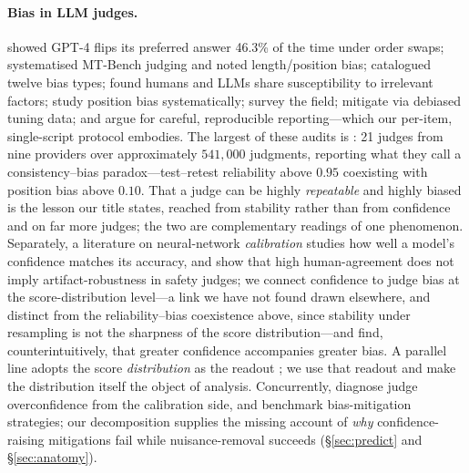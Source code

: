 \documentclass[11pt]{article}
\begin{document}
\paragraph{Bias in LLM judges.} \citet{wang2023large} showed GPT-4 flips its
preferred answer 46.3\% of the time under order swaps; \citet{zheng2023judging}
systematised MT-Bench judging and noted length/position bias; \citet{ye2024justice}
catalogued twelve bias types; \citet{chen2024humans} found humans and LLMs share
susceptibility to irrelevant factors; \citet{shi2024position} study position bias
systematically; \citet{gu2024survey} survey the field; \citet{park2024offsetbias}
mitigate via debiased tuning data; and \citet{lee2025correctly} argue for careful,
reproducible reporting---which our per-item, single-script protocol embodies. The
largest of these audits is \citet{norman2026reliability}: 21 judges from nine
providers over approximately $541{,}000$ judgments, reporting what they call a
consistency--bias paradox---test--retest reliability above $0.95$ coexisting with
position bias above $0.10$. That a judge can be highly \emph{repeatable} and highly
biased is the lesson our title states, reached from stability rather than from
confidence and on far more judges; the two are complementary readings of one
phenomenon. Separately, a literature on neural-network \emph{calibration}
\citep{guo2017calibration,kadavath2022know} studies how well a model's confidence
matches its accuracy, and \citet{saferluckier2025} show that high human-agreement
does not imply artifact-robustness in safety judges; we connect confidence to judge
bias at the score-distribution level---a link we have not found drawn elsewhere,
and distinct from the reliability--bias coexistence above, since stability under
resampling is not the sharpness of the score distribution---and find,
counterintuitively, that greater confidence accompanies greater bias. A parallel
line adopts the score \emph{distribution} as the readout
\citep{liu2023geval,wang2025judgmentdist,trustjudge2025}; we use that readout and
make the distribution itself the object of analysis. Concurrently,
\citet{tian2025overconfidence} diagnose judge overconfidence from the calibration
side, and \citet{soumik2026judging} benchmark bias-mitigation strategies; our
decomposition supplies the missing account of \emph{why} confidence-raising
mitigations fail while nuisance-removal succeeds
(\S\ref{sec:predict} and \S\ref{sec:anatomy}).
\end{document}
